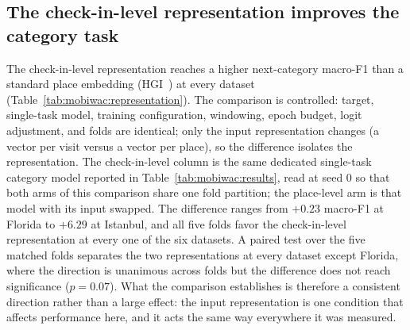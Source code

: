 \subsection{The check-in-level representation improves the category task}
\label{sec:mobiwac:results-part1}
The check-in-level representation reaches a higher next-category macro-F1 than a standard place
embedding (HGI~\cite{huang2023hgi}) at every dataset
(Table~\ref{tab:mobiwac:representation}). The comparison is controlled: target, single-task model, training configuration, windowing, epoch budget, logit adjustment, and folds are identical; only the input representation changes (a vector per visit versus a vector per place), so the difference isolates the representation. The check-in-level column is the same dedicated single-task category model reported in Table~\ref{tab:mobiwac:results}, read at seed 0 so that both arms of this comparison share one fold partition; the place-level arm is that model with its input swapped. The difference ranges from $+0.23$ macro-F1 at Florida to
$+6.29$ at Istanbul, and all five folds favor the check-in-level representation at every one of the
six datasets. A paired test over the five matched folds separates the two representations at every
dataset except Florida, where the direction is unanimous across folds but the difference does not
reach significance ($p=0.07$). What the comparison establishes is therefore a consistent direction
rather than a large effect: the input representation is one condition that affects performance
here, and it acts the same way everywhere it was measured.

